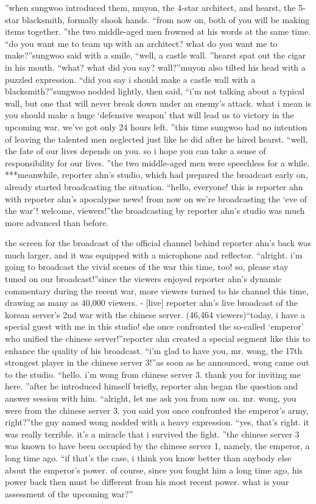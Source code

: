 ”when sungwoo introduced them, muyon, the 4-star architect, and hearst, the 5-star blacksmith, formally shook hands.
“from now on, both of you will be making items together.
”the two middle-aged men frowned at his words at the same time.
“do you want me to team up with an architect? what do you want me to make?”sungwoo said with a smile, “well, a castle wall.
”hearst spat out the cigar in his mouth.
“what? what did you say? wall?”muyon also tilted his head with a puzzled expression.
“did you say i should make a castle wall with a blacksmith?”sungwoo nodded lightly, then said, “i’m not talking about a typical wall, but one that will never break down under an enemy’s attack.
 what i mean is you should make a huge ‘defensive weapon’ that will lead us to victory in the upcoming war.
 we’ve got only 24 hours left.
”this time sungwoo had no intention of leaving the talented men neglected just like he did after he hired hearst.
“well, the fate of our lives depends on you.
 so i hope you can take a sense of responsibility for our lives.
”the two middle-aged men were speechless for a while.
***meanwhile, reporter ahn’s studio, which had prepared the broadcast early on, already started broadcasting the situation.
“hello, everyone! this is reporter ahn with reporter ahn’s apocalypse news! from now on we’re broadcasting the ‘eve of the war’! welcome, viewers!”the broadcasting by reporter ahn’s studio was much more advanced than before.


the screen for the broadcast of the official channel behind reporter ahn’s back was much larger, and it was equipped with a microphone and reflector.
“alright.
 i’m going to broadcast the vivid scenes of the war this time, too! so, please stay tuned on our broadcast!”since the viewers enjoyed reporter ahn’s dynamic commentary during the recent war, more viewers turned to his channel this time, drawing as many as 40,000 viewers.
- [live] reporter ahn’s live broadcast of the korean server’s 2nd war with the chinese server.
 (46,464 viewers)“today, i have a special guest with me in this studio! she once confronted the so-called ‘emperor’ who unified the chinese server!”reporter ahn created a special segment like this to enhance the quality of his broadcast.
“i’m glad to have you, mr.
 wong, the 17th strongest player in the chinese server 3!”as soon as he announced, wong came out to the studio.
“hello.
 i’m wong from chinese server 3.
 thank you for inviting me here.
”after he introduced himself briefly, reporter ahn began the question and answer session with him.
“alright, let me ask you from now on.
 mr.
 wong, you were from the chinese server 3.
 you said you once confronted the emperor’s army, right?”the guy named wong nodded with a heavy expression.
“yes, that’s right.
 it was really terrible.
 it’s a miracle that i survived the fight.
”the chinese server 3 was known to have been occupied by the chinese server 1, namely, the emperor, a long time ago.
“if that’s the case, i think you know better than anybody else about the emperor’s power.
 of course, since you fought him a long time ago, his power back then must be different from his most recent power.
 what is your assessment of the upcoming war?”

 